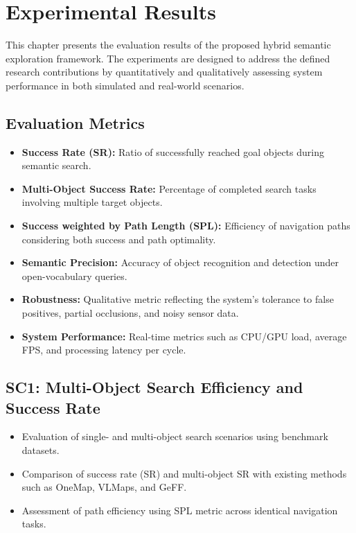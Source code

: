 \chapter{Experimental Results}
This chapter presents the evaluation results of the proposed hybrid semantic exploration framework. The experiments are designed to address the defined research contributions by quantitatively and qualitatively assessing system performance in both simulated and real-world scenarios.

\section{Evaluation Metrics}
\begin{itemize}
    \item \textbf{Success Rate (SR):} Ratio of successfully reached goal objects during semantic search.
    \item \textbf{Multi-Object Success Rate:} Percentage of completed search tasks involving multiple target objects.
    \item \textbf{Success weighted by Path Length (SPL):} Efficiency of navigation paths considering both success and path optimality.
    \item \textbf{Semantic Precision:} Accuracy of object recognition and detection under open-vocabulary queries.
    \item \textbf{Robustness:} Qualitative metric reflecting the system's tolerance to false positives, partial occlusions, and noisy sensor data.
    \item \textbf{System Performance:} Real-time metrics such as CPU/GPU load, average FPS, and processing latency per cycle.
\end{itemize}

\section{SC1: Multi-Object Search Efficiency and Success Rate}
\begin{itemize}
    \item Evaluation of single- and multi-object search scenarios using benchmark datasets.
    \item Comparison of success rate (SR) and multi-object SR with existing methods such as OneMap, VLMaps, and GeFF.
    \item Assessment of path efficiency using SPL metric across identical navigation tasks.
\end{itemize}

